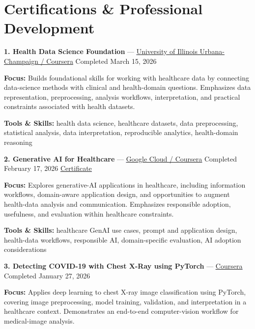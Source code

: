 \documentclass[9pt,letterpaper]{extarticle}
\begin{document}
\section{Certifications \& Professional Development}
\noindent\textbf{1. Health Data Science Foundation} {\small --- \textcolor{blue}{\underline{\href{https://www.coursera.org/account/accomplishments/verify/42IDM121SWBS}{University of Illinois Urbana-Champaign / Coursera}}} \textbar{} Completed \textbar{} March 15, 2026}\par
\textbf{Focus:} Builds foundational skills for working with healthcare data by connecting data-science methods with clinical and health-domain questions. Emphasizes data representation, preprocessing, analysis workflows, interpretation, and practical constraints associated with health datasets.\par
{\small\textbf{Tools \& Skills:} health data science, healthcare datasets, data preprocessing, statistical analysis, data interpretation, reproducible analytics, health-domain reasoning\par}
\vspace{2pt}
\noindent\textbf{2. Generative AI for Healthcare} {\small --- \textcolor{blue}{\underline{\href{https://www.coursera.org/account/accomplishments/verify/P5AXL262N71P}{Google Cloud / Coursera}}} \textbar{} Completed \textbar{} February 17, 2026 \textbar{} \textcolor{blue}{\underline{\href{https://waseemraza844.github.io/portfolio/certificates/Coursera P5AXL262N71P.pdf}{Certificate}}}}\par
\textbf{Focus:} Explores generative-AI applications in healthcare, including information workflows, domain-aware application design, and opportunities to augment health-data analysis and communication. Emphasizes responsible adoption, usefulness, and evaluation within healthcare constraints.\par
{\small\textbf{Tools \& Skills:} healthcare GenAI use cases, prompt and application design, health-data workflows, responsible AI, domain-specific evaluation, AI adoption considerations\par}
\vspace{2pt}
\noindent\textbf{3. Detecting COVID-19 with Chest X-Ray using PyTorch} {\small --- \textcolor{blue}{\underline{\href{https://www.coursera.org/account/accomplishments/verify/MI6TUKWF37N2}{Coursera}}} \textbar{} Completed \textbar{} January 27, 2026}\par
\textbf{Focus:} Applies deep learning to chest X-ray image classification using PyTorch, covering image preprocessing, model training, validation, and interpretation in a healthcare context. Demonstrates an end-to-end computer-vision workflow for medical-image analysis.\par
\end{document}
